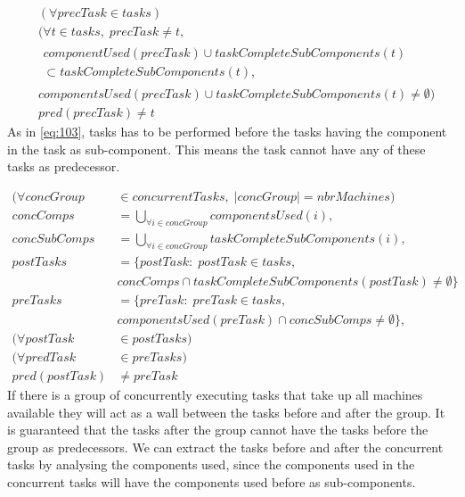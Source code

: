   \begin{equation}
  \begin{aligned}\label{eq:90}
  &(\forall precTask \in tasks) \\
  &(\forall t \in tasks, \; precTask \neq t,\\
  &\begin{aligned}componentUsed(precTask) \cup taskCompleteSubComponents(t) \\ \subset taskCompleteSubComponents(t), \end{aligned}\\
  &componentsUsed(precTask) \cup taskCompleteSubComponents(t) \neq \emptyset) \\
  &pred(precTask) \neq t
  \end{aligned}
  \end{equation}
 As in \ref{eq:103}, tasks has to be performed before the tasks having the component in the task as sub-component. This means the task cannot have any of these tasks as predecessor.
  
  \begin{equation}
  \begin{aligned}\label{eq:91}
  (\forall concGroup &\in concurrentTasks, \; |concGroup| = nbrMachines) \\
  concComps &= \bigcup_{\forall i \in concGroup}componentsUsed(i), \\
  concSubComps &= \bigcup_{\forall i \in concGroup}taskCompleteSubComponents(i), \\
  postTasks &= \{postTask : \; postTask \in tasks,\\
  &concComps \cap taskCompleteSubComponents(postTask) \neq \emptyset\}\\
  preTasks &= \{preTask : \; preTask \in tasks,\\
  &componentsUsed(preTask) \cap concSubComps \neq \emptyset\}, \\
  (\forall postTask &\in postTasks) \\
  (\forall predTask &\in preTasks) \\
  pred(postTask) &\neq preTask
  \end{aligned}
  \end{equation}
  If there is a group of concurrently executing tasks that take up all machines available they will act as a wall between the tasks before and after the group. It is guaranteed that the tasks after the group cannot have the tasks before the group as predecessors. We can extract the tasks before and after the concurrent tasks by analysing the components used, since the components used in the concurrent tasks will have the components used before as sub-components.
 